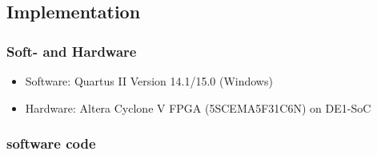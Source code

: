 \subsection{Implementation}
\subsubsection{Soft- and Hardware}
\begin{itemize}
  \item Software: Quartus II Version 14.1/15.0 (Windows)
  \item Hardware: Altera Cyclone V FPGA (5SCEMA5F31C6N) on DE1-SoC
\end{itemize}

\subsubsection{software code}
